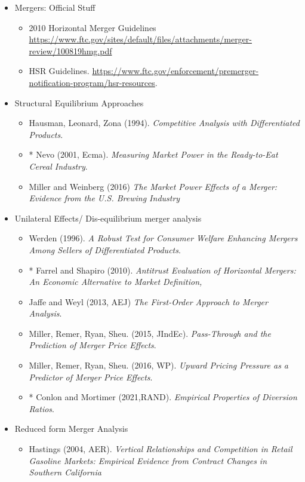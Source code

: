 \documentclass[11pt]{article}
\begin{document}
\begin{itemize}
\item Mergers: Official Stuff
\begin{itemize}
\item 2010 Horizontal Merger Guidelines \url{https://www.ftc.gov/sites/default/files/attachments/merger-review/100819hmg.pdf}
\item HSR Guidelines. \url{https://www.ftc.gov/enforcement/premerger-notification-program/hsr-resources}.
\end{itemize}
\item Structural Equilibrium Approaches
\begin{itemize}
\item Hausman, Leonard, Zona (1994). \textit{Competitive Analysis with Differentiated Products}.
\item * Nevo (2001, Ecma). \textit{Measuring Market Power in the Ready-to-Eat Cereal Industry}.
\item Miller and Weinberg (2016) \textit{The Market Power Effects of a Merger: Evidence from the U.S. Brewing Industry}
\end{itemize}
\item Unilateral Effects/ Dis-equilibrium merger analysis
\begin{itemize}
\item Werden (1996). \textit{A Robust Test for Consumer Welfare Enhancing
Mergers Among Sellers of Differentiated Products}.
\item * Farrel and Shapiro (2010). \textit{Antitrust Evaluation of Horizontal Mergers: An Economic Alternative to Market Definition,}
\item Jaffe and Weyl (2013, AEJ) \textit{The First-Order Approach to Merger Analysis}.
\item Miller, Remer, Ryan, Sheu. (2015, JIndEc). \textit{Pass-Through and the Prediction of Merger Price Effects}.
\item Miller, Remer, Ryan, Sheu. (2016, WP). \textit{Upward Pricing Pressure as a Predictor of Merger Price Effects}.
\item * Conlon and Mortimer (2021,RAND). \textit{Empirical Properties of Diversion Ratios}.
\end{itemize}
\item Reduced form Merger Analysis
\begin{itemize}
\item Hastings (2004, AER). \textit{Vertical Relationships and Competition in Retail Gasoline Markets: Empirical Evidence from Contract Changes in Southern California}

\end{itemize}
\end{itemize}
\end{document}
